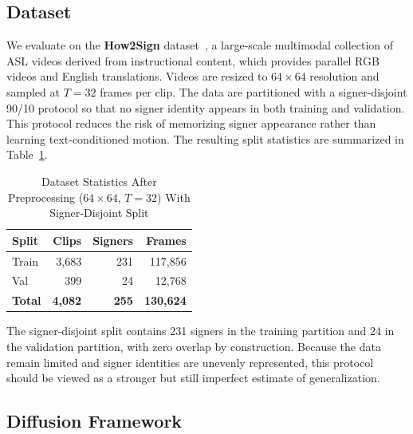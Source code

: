 \documentclass{ieeeaccess}
\begin{document}
\subsection{Dataset}
\label{subsec:dataset}
{\color{blue}%

We evaluate on the \textbf{How2Sign} dataset~\cite{duarte2021how2sign}, a large-scale multimodal collection of ASL videos derived from instructional content, which provides parallel RGB videos and English translations. Videos are resized to $64 \times 64$ resolution and sampled at $T = 32$ frames per clip. The data are partitioned with a signer-disjoint 90/10 protocol so that no signer identity appears in both training and validation. This protocol reduces the risk of memorizing signer appearance rather than learning text-conditioned motion. The resulting split statistics are summarized in Table~\ref{tab:dataset_stats}.

\begin{table}[H]
    \centering
    \caption{Dataset Statistics After Preprocessing ($64\times64$, $T=32$) With Signer-Disjoint Split}
    \label{tab:dataset_stats}
    \renewcommand{\arraystretch}{1.15}
    \begin{tabular}{@{} l r r r @{}}
        \toprule
        \rowcolor{tableheader}
        \textbf{Split} & \textbf{Clips} & \textbf{Signers} & \textbf{Frames} \\
        \midrule
        \rowcolor{tablerow1}
        Train  & 3,683 & 231 & 117,856 \\
        \rowcolor{tablerow2}
        Val    & 399   & 24  & 12,768 \\
        \midrule
        \rowcolor{tablerow1}
        \textbf{Total}  & \textbf{4,082} & \textbf{255} & \textbf{130,624} \\
        \bottomrule
    \end{tabular}
\end{table}

    The signer-disjoint split contains 231 signers in the training partition and 24 in the validation partition, with zero overlap by construction. Because the data remain limited and signer identities are unevenly represented, this protocol should be viewed as a stronger but still imperfect estimate of generalization.

}
\subsection{Diffusion Framework}
\label{subsec:background_diffusion}
\end{document}
